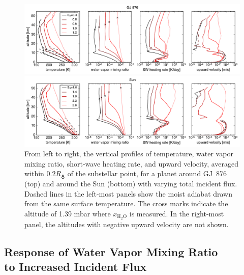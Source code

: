 \documentclass[11pt,numberedappendix,twocolappendix,]{emulateapj}
\def\water{H$_2$O}
\def\xwater{$x_\text{\water}$}
\def\preslevel{1.39 mbar}
\def\wv{water vapor}
\begin{document}
\begin{figure}[tbh]
    \begin{center}
    \includegraphics[width=0.9\hsize]{AqOH0TLS_GJ876_SW29_temp_xH2O_heat_vz_ver3.pdf}
    \end{center}
    \begin{center}
        \includegraphics[width=0.9\hsize]{AqOH0TLS_Sun_SW29_temp_xH2O_heat_vz_ver4.pdf}
    \end{center}
\caption{From left to right, the vertical profiles of temperature, \wv{} mixing ratio, short-wave heating rate, and upward velocity, averaged within $0.2R_\earth$ of the substellar point, for a planet around GJ~876 (top) and around the Sun (bottom) with varying total incident flux. Dashed lines in the left-most panels show the moist adiabat drawn from the same surface temperature. The cross marks indicate the altitude of \preslevel{} where \xwater{} is measured. In the right-most panel, the altitudes with negative upward velocity are not shown. }
\label{fig:AqOH0TLS_GJ876_temp_xH2O_vz_heat}
\end{figure}


\subsection{Response of Water Vapor Mixing Ratio \\to Increased Incident Flux}
\label{ss:result_H2Omixingratio}
\end{document}
